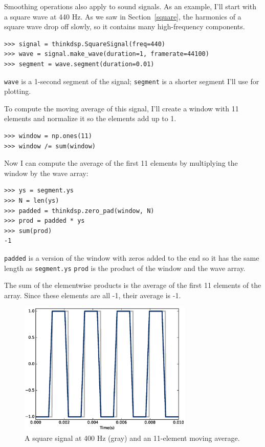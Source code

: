 \documentclass[12pt]{book}
\begin{document}
Smoothing operations also apply to sound signals.  As an example, I'll
start with a square wave at 440 Hz.  As we saw in
Section~\ref{square}, the harmonics of a square wave drop off
slowly, so it contains many high-frequency components.

\begin{verbatim}
>>> signal = thinkdsp.SquareSignal(freq=440)
>>> wave = signal.make_wave(duration=1, framerate=44100)
>>> segment = wave.segment(duration=0.01)
\end{verbatim}

{\tt wave} is a 1-second segment of the signal; {\tt segment}
is a shorter segment I'll use for plotting.

To compute the moving average of this signal, I'll create
a window with 11 elements and normalize it so the elements
add up to 1.

\begin{verbatim}
>>> window = np.ones(11)
>>> window /= sum(window)
\end{verbatim}

Now I can compute the average of the first 11 elements by
multiplying the window by the wave array:

\begin{verbatim}
>>> ys = segment.ys
>>> N = len(ys)
>>> padded = thinkdsp.zero_pad(window, N)
>>> prod = padded * ys
>>> sum(prod)
-1
\end{verbatim}

{\tt padded} is a version of the window with zeros added to
the end so it has the same length as {\tt segment.ys}
{\tt prod} is the product of the window and the wave array.

The sum of the elementwise products is the average of the first 11
elements of the array.  Since these elements are all -1, their average
is -1.

\begin{figure}
\centerline{\includegraphics[height=2.5in]{figs/convolution2.eps}}
\caption{A square signal at 400 Hz (gray) and an 11-element
moving average.}
\label{fig.convolution2}
\end{figure}
\end{document}
